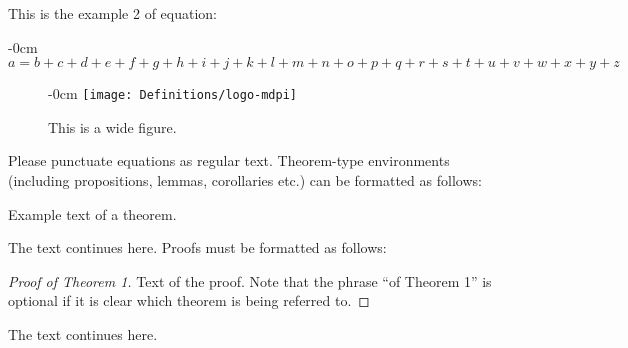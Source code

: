 \documentclass[mathematics,article,submit,pdftex,moreauthors]{Definitions/mdpi}
\begin{document}
This is the example 2 of equation:
\begin{adjustwidth}{-\extralength}{0cm}
\begin{equation}
a = b + c + d + e + f + g + h + i + j + k + l + m + n + o + p + q + r + s + t + u + v + w + x + y + z
\end{equation}
\end{adjustwidth}


\begin{figure}[H]
\begin{adjustwidth}{-\extralength}{0cm}
\centering
\texttt{[image: Definitions/logo-mdpi]}
\end{adjustwidth}
\caption{This is a wide figure.\label{fig2}}
\end{figure}
\unskip


Please punctuate equations as regular text. Theorem-type environments (including propositions, lemmas, corollaries etc.) can be formatted as follows:
\begin{Theorem}
Example text of a theorem.
\end{Theorem}

The text continues here. Proofs must be formatted as follows:

\begin{proof}[Proof of Theorem 1]
Text of the proof. Note that the phrase ``of Theorem 1'' is optional if it is clear which theorem is being referred to.
\end{proof}
The text continues here.
\end{document}
